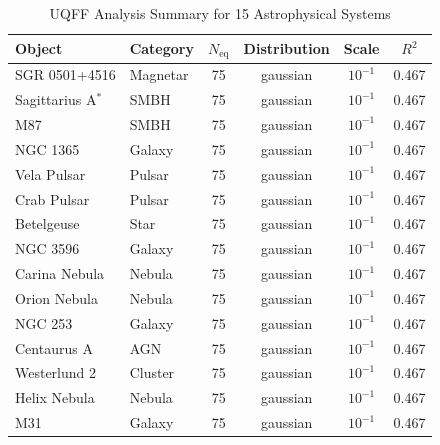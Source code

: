 
\begin{table}[ht]
\centering
\caption{UQFF Analysis Summary for 15 Astrophysical Systems}
\label{tab:uqff_batch_summary}
\begin{tabular}{llcccc}
\toprule
Object & Category & $N_{\mathrm{eq}}$ & Distribution & Scale & $R^2$ \\
\midrule
SGR 0501+4516 & Magnetar & 75 & gaussian & $10^{-1}$ & 0.467 \\
Sagittarius A$^*$ & SMBH & 75 & gaussian & $10^{-1}$ & 0.467 \\
M87 & SMBH & 75 & gaussian & $10^{-1}$ & 0.467 \\
NGC 1365 & Galaxy & 75 & gaussian & $10^{-1}$ & 0.467 \\
Vela Pulsar & Pulsar & 75 & gaussian & $10^{-1}$ & 0.467 \\
Crab Pulsar & Pulsar & 75 & gaussian & $10^{-1}$ & 0.467 \\
Betelgeuse & Star & 75 & gaussian & $10^{-1}$ & 0.467 \\
NGC 3596 & Galaxy & 75 & gaussian & $10^{-1}$ & 0.467 \\
Carina Nebula & Nebula & 75 & gaussian & $10^{-1}$ & 0.467 \\
Orion Nebula & Nebula & 75 & gaussian & $10^{-1}$ & 0.467 \\
NGC 253 & Galaxy & 75 & gaussian & $10^{-1}$ & 0.467 \\
Centaurus A & AGN & 75 & gaussian & $10^{-1}$ & 0.467 \\
Westerlund 2 & Cluster & 75 & gaussian & $10^{-1}$ & 0.467 \\
Helix Nebula & Nebula & 75 & gaussian & $10^{-1}$ & 0.467 \\
M31 & Galaxy & 75 & gaussian & $10^{-1}$ & 0.467 \\
\bottomrule
\end{tabular}
\end{table}
